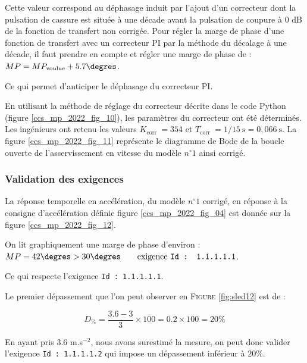 \ifprof
\begin{corrige}
Cette valeur correspond au déphasage induit par l'ajout d'un correcteur dont la pulsation de cassure est située à une décade avant la pulsation de coupure à $0$ dB de la fonction de transfert non corrigée. Pour régler la marge de phase d'une fonction de transfert avec un correcteur PI par la méthode du décalage à une décade, il faut prendre en compte et régler une marge de phase de :
$M P = M P_\text{voulue} + 5.7\degres$.

Ce qui permet d'anticiper le déphasage du correcteur PI.
\end{corrige}
\else
\fi

\ifprof
\else
En utilisant la méthode de réglage du correcteur décrite dans le code Python (figure \ref{ccs_mp_2022_fig_10}), les paramètres du correcteur ont été déterminés. Les ingénieurs ont retenu les valeurs $K_{\text {corr }}=354$ et $T_{\text {corr }}=1 / 15 \mathrm{~s}=0,066 \mathrm{~s}$. La figure \ref{ccs_mp_2022_fig_11} représente le diagramme de Bode de la boucle ouverte de l'asservissement en vitesse du modèle $n^{\circ} 1$ ainsi corrigé.
\fi

\subsubsection{Validation des exigences \label{ccs_mp_2022_sec_3B4}}
La réponse temporelle en accélération, du modèle $n^{\circ} 1$ corrigé, en réponse à la consigne d'accélération définie figure \ref{ccs_mp_2022_fig_04} est donnée sur la figure \ref{ccs_mp_2022_fig_12}.

\ifprof
\begin{corrige}
On lit graphiquement une marge de phase d'environ :$ M P = 42\degres > 30\degres \qquad \text{exigence \texttt{Id : 1.1.1.1.1}}$.

Ce qui respecte l'exigence \texttt{Id : 1.1.1.1.1}.
\end{corrige}
\else
\fi

\ifprof
\begin{corrige}
Le premier dépassement que l'on peut observer en \textsc{Figure} \ref{fig:sled12} est de :

$$ D_\% = \dfrac{3.6 - 3}{3} \times 100 = 0.2 \times 100 = 20\%$$

En ayant pris $3.6$ m.s$^{-2}$, nous avons surestimé la mesure, on peut donc valider l'exigence \texttt{Id : 1.1.1.1.2} qui impose un dépassement inférieur à $20\%$.
\end{corrige}
\else
\fi

